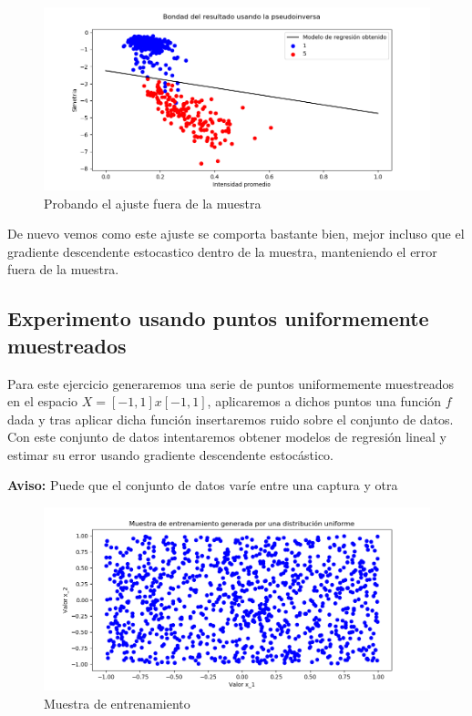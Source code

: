 \documentclass[12pt, spanish]{article}
\begin{document}
\begin{figure}[H]
  \centering
      \includegraphics[scale = 0.70]{ej2-1-pseudo-out.png}
 		 \caption{Probando el ajuste fuera de la muestra}
  		\label{fig:ej2-1-pseudo-out}

\end{figure}

De nuevo vemos como este ajuste se comporta bastante bien, mejor incluso que el gradiente descendente estocastico dentro de la muestra, manteniendo el error fuera de la muestra.

\subsection{Experimento usando puntos uniformemente muestreados}

Para este ejercicio generaremos una serie de puntos uniformemente muestreados en el espacio $X = [-1, 1] x [-1, 1]$, aplicaremos a dichos puntos una función $f$ dada y tras aplicar dicha función insertaremos ruido sobre el conjunto de datos. Con este conjunto de datos intentaremos obtener modelos de regresión lineal y estimar su error usando gradiente descendente estocástico.


\textbf{Aviso:} Puede que el conjunto de datos varíe entre una captura y otra 

\begin{figure}[H]
  \centering
      \includegraphics[scale = 0.70]{entrenamiento.png}
 		 \caption{Muestra de entrenamiento}
  		\label{fig:ej2-2-m}

\end{figure}
\end{document}
